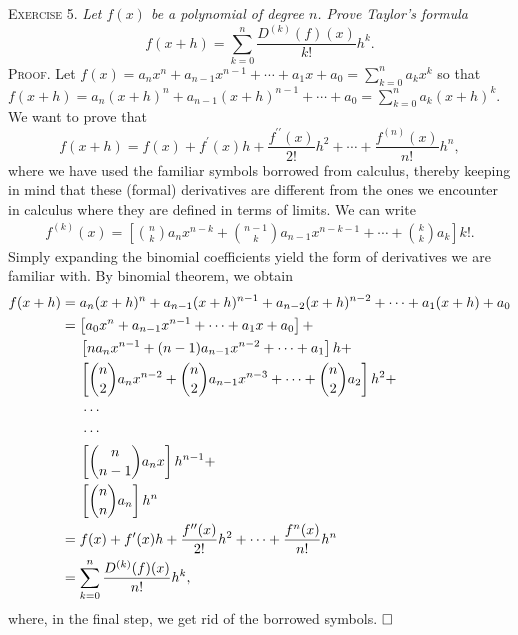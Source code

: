 \documentclass[11pt, leqno]{article}
\newcommand{\done}{\ensuremath{\hfill\square}}
\begin{document}
\textsc{Exercise 5}. \emph{Let $f(x)$ be a polynomial of degree $n$. Prove Taylor's formula 
\begin{displaymath}
f(x+h) = \sum_{k=0}^n \frac{D^{(k)}(f)(x)}{k!} h^k.
\end{displaymath}}\textsc{Proof}. Let $f(x) = a_nx^n + a_{n-1}x^{n-1} + \cdots + a_1x + a_0 = \sum_{k=0}^n a_kx^k$ so that $f(x+h) = a_n(x+h)^n + a_{n-1}(x+h)^{n-1} + \cdots + a_0 = \sum_{k=0}^n a_k(x+h)^k$. We want to prove that 
\begin{displaymath}
f(x+h) = f(x) + f^{\prime}(x)h + \frac{f^{\prime\prime}(x)}{2!}h^2 + \cdots + \frac{f^{(n)}(x)}{n!}h^n,
\end{displaymath}
where we have used the familiar symbols borrowed from calculus, thereby keeping in mind that these (formal) derivatives are different from the ones we encounter in calculus where they are defined in terms of limits. We can write 
\begin{align*}
f^{(k)}(x) = \left[\binom{n}{k} a_nx^{n-k} + \binom{n-1}{k}a_{n-1} x^{n-k-1} + \cdots + \binom{k}{k}a_k \right]k!.
\end{align*}
Simply expanding the binomial coefficients yield the form of derivatives we are familiar with. By binomial theorem, we obtain
\begin{align*}
  f(x+h) &= a_n(x+h)^n + a_{n-1}(x+h)^{n-1} + a_{n-2}(x+h)^{n-2} + \cdots + a_1(x+h) + a_0 \\
         &= \left[ a_0x^n + a_{n-1}x^{n-1} + \cdots + a_1x + a_0 \right] + \\
         &\hspace{4.5mm} \left[n a_nx^{n-1} + (n-1)a_{n-1}x^{n-2} + \cdots + a_1 \right] h + \\
         &\hspace{4.5mm} \left[ \binom{n}{2}a_nx^{n-2} + \binom{n}{2} a_{n-1}x^{n-3} + \cdots + \binom{n}{2} a_2  \right] h^2 + \\
         &\hspace{5mm} \cdots \\
         &\hspace{5mm} \cdots \\
         &\hspace{4.5mm} \left[ \binom{n}{n-1}a_nx \right] h^{n-1} + \\
         &\hspace{4.5mm} \left[\binom{n}{n}a_n\right]h^n \\
         &= f(x) + f^{\prime}(x)h + \frac{f^{\prime\prime}(x)}{2!}h^2 + \cdots + \frac{f^n(x)}{n!} h^n \\
  &= \sum_{k=0}^n \frac{D^{(k)}(f)(x)}{n!}h^k,
\end{align*}
where, in the final step, we get rid of the borrowed symbols. \done
\end{document}
